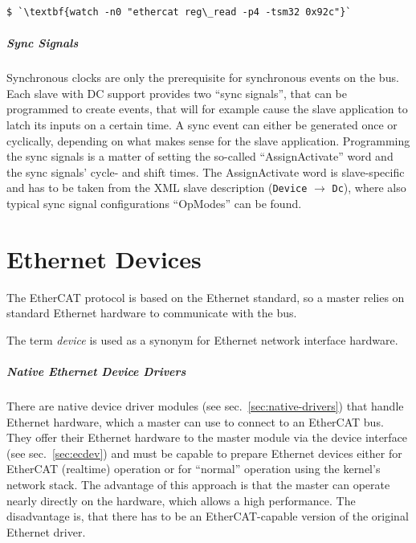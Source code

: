 \documentclass[a4paper,12pt,BCOR6mm,bibtotoc,idxtotoc]{scrbook}
\begin{document}
\begin{lstlisting}
$ `\textbf{watch -n0 "ethercat reg\_read -p4 -tsm32 0x92c"}`
\end{lstlisting}

\paragraph{Sync Signals} Synchronous clocks are only the prerequisite for
synchronous events on the bus. Each slave with DC support provides two ``sync
signals'', that can be programmed to create events, that will for example
cause the slave application to latch its inputs on a certain time. A sync
event can either be generated once or cyclically, depending on what makes
sense for the slave application. Programming the sync signals is a matter of
setting the so-called ``AssignActivate'' word and the sync signals' cycle- and
shift times. The AssignActivate word is slave-specific and has to be taken
from the XML slave description (\lstinline+Device+ $\rightarrow$
\lstinline+Dc+), where also typical sync signal configurations ``OpModes'' can
be found.


\chapter{Ethernet Devices}
\label{sec:devices}

The EtherCAT protocol is based on the Ethernet standard, so a master relies on
standard Ethernet hardware to communicate with the bus.

The term \textit{device} is used as a synonym for Ethernet network interface
hardware.

\paragraph{Native Ethernet Device Drivers} There are native device driver
modules (see sec.~\ref{sec:native-drivers}) that handle Ethernet hardware,
which a master can use to connect to an EtherCAT bus. They offer their
Ethernet hardware to the master module via the device interface (see
sec.~\ref{sec:ecdev}) and must be capable to prepare Ethernet devices either
for EtherCAT (realtime) operation or for ``normal'' operation using the
kernel's network stack. The advantage of this approach is that the master can
operate nearly directly on the hardware, which allows a high performance. The
disadvantage is, that there has to be an EtherCAT-capable version of the
original Ethernet driver.
\end{document}
